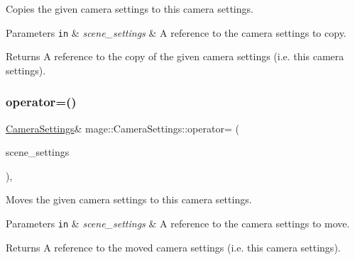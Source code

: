 Copies the given camera settings to this camera settings.


\begin{DoxyParams}[1]{Parameters}
\mbox{\tt in}  & {\em scene\+\_\+settings} & A reference to the camera settings to copy. \\
\hline
\end{DoxyParams}
\begin{DoxyReturn}{Returns}
A reference to the copy of the given camera settings (i.\+e. this camera settings). 
\end{DoxyReturn}
\hypertarget{classmage_1_1_camera_settings_a834ce70b367d3bc70d2c4407b05ce59b}{}\label{classmage_1_1_camera_settings_a834ce70b367d3bc70d2c4407b05ce59b} 
\subsubsection{\texorpdfstring{operator=()}{operator=()}\hspace{0.1cm}{\footnotesize\ttfamily [2/2]}}
{\footnotesize\ttfamily \hyperlink{classmage_1_1_camera_settings}{Camera\+Settings}\& mage\+::\+Camera\+Settings\+::operator= (\begin{DoxyParamCaption}\item[{\hyperlink{classmage_1_1_camera_settings}{Camera\+Settings} \&\&}]{scene\+\_\+settings }\end{DoxyParamCaption})\hspace{0.3cm}{\ttfamily [default]}, {\ttfamily [noexcept]}}

Moves the given camera settings to this camera settings.


\begin{DoxyParams}[1]{Parameters}
\mbox{\tt in}  & {\em scene\+\_\+settings} & A reference to the camera settings to move. \\
\hline
\end{DoxyParams}
\begin{DoxyReturn}{Returns}
A reference to the moved camera settings (i.\+e. this camera settings). 
\end{DoxyReturn}
\hypertarget{classmage_1_1_camera_settings_a358ab9da30af67ca8b1ea2a5eb5a2710}{}\label{classmage_1_1_camera_settings_a358ab9da30af67ca8b1ea2a5eb5a2710} 
